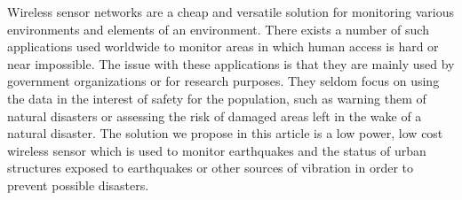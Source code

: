 Wireless sensor networks are a cheap and versatile solution for monitoring various environments 
and elements of an environment. There exists a number of such applications used worldwide to monitor 
areas in which human access is hard or near impossible. The issue with these applications is that 
they are mainly used by government organizations or for research purposes. They seldom focus on 
using the data in the interest of safety for the population, such as warning them of natural 
disasters or assessing the risk of damaged areas left in the wake of a natural disaster. The 
solution we propose in this article is a low power, low cost wireless sensor which is used to 
monitor earthquakes and the status of urban structures exposed to earthquakes or other sources 
of vibration in order to prevent possible disasters.
